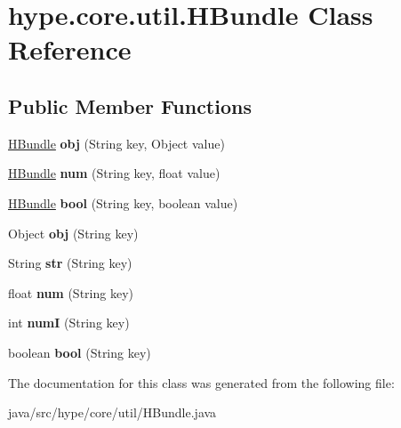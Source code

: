 \hypertarget{classhype_1_1core_1_1util_1_1_h_bundle}{\section{hype.\-core.\-util.\-H\-Bundle Class Reference}
\label{classhype_1_1core_1_1util_1_1_h_bundle}
}
\subsection*{Public Member Functions}
\begin{DoxyCompactItemize}
\item 
\hypertarget{classhype_1_1core_1_1util_1_1_h_bundle_a8b99da9c9b64722ed99e29f479e0646b}{\hyperlink{classhype_1_1core_1_1util_1_1_h_bundle}{H\-Bundle} {\bfseries obj} (String key, Object value)}\label{classhype_1_1core_1_1util_1_1_h_bundle_a8b99da9c9b64722ed99e29f479e0646b}

\item 
\hypertarget{classhype_1_1core_1_1util_1_1_h_bundle_a68b3311516b49de04a52180fe57eac9c}{\hyperlink{classhype_1_1core_1_1util_1_1_h_bundle}{H\-Bundle} {\bfseries num} (String key, float value)}\label{classhype_1_1core_1_1util_1_1_h_bundle_a68b3311516b49de04a52180fe57eac9c}

\item 
\hypertarget{classhype_1_1core_1_1util_1_1_h_bundle_ac43b7f5330f759a68690deb413190dc6}{\hyperlink{classhype_1_1core_1_1util_1_1_h_bundle}{H\-Bundle} {\bfseries bool} (String key, boolean value)}\label{classhype_1_1core_1_1util_1_1_h_bundle_ac43b7f5330f759a68690deb413190dc6}

\item 
\hypertarget{classhype_1_1core_1_1util_1_1_h_bundle_a929b1222f8e094d630dd1e01ad953004}{Object {\bfseries obj} (String key)}\label{classhype_1_1core_1_1util_1_1_h_bundle_a929b1222f8e094d630dd1e01ad953004}

\item 
\hypertarget{classhype_1_1core_1_1util_1_1_h_bundle_a193cc7e97f5cee5c0f2991cebcd26597}{String {\bfseries str} (String key)}\label{classhype_1_1core_1_1util_1_1_h_bundle_a193cc7e97f5cee5c0f2991cebcd26597}

\item 
\hypertarget{classhype_1_1core_1_1util_1_1_h_bundle_a0168efdc92f3951169d38d40e53e3f5e}{float {\bfseries num} (String key)}\label{classhype_1_1core_1_1util_1_1_h_bundle_a0168efdc92f3951169d38d40e53e3f5e}

\item 
\hypertarget{classhype_1_1core_1_1util_1_1_h_bundle_a760a3fb12416515a8540eaf3a95cad37}{int {\bfseries num\-I} (String key)}\label{classhype_1_1core_1_1util_1_1_h_bundle_a760a3fb12416515a8540eaf3a95cad37}

\item 
\hypertarget{classhype_1_1core_1_1util_1_1_h_bundle_ad6128e96f33b11ce4bd367510d04fe2c}{boolean {\bfseries bool} (String key)}\label{classhype_1_1core_1_1util_1_1_h_bundle_ad6128e96f33b11ce4bd367510d04fe2c}

\end{DoxyCompactItemize}


The documentation for this class was generated from the following file\-:\begin{DoxyCompactItemize}
\item 
java/src/hype/core/util/H\-Bundle.\-java\end{DoxyCompactItemize}
